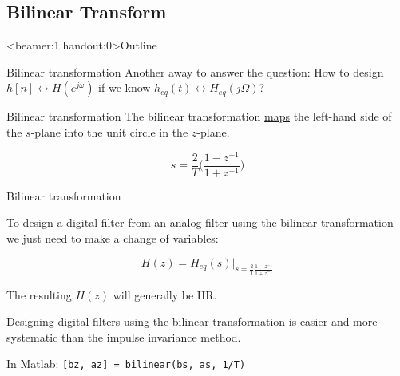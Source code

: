 \documentclass[10pt, handout]{beamer}
\begin{document}
%
\subsection{Bilinear Transform}
\begin{frame}<beamer:1|handout:0>{Outline}
\tableofcontents[currentsubsection]
\end{frame}

%
\begin{frame}{Bilinear transformation}
Another away to answer the question: How to design $h[n] \longleftrightarrow H(e^{j\omega})$ if we know $h_{eq}(t) \longleftrightarrow H_{eq}(j\Omega)$?

\begin{block}{Bilinear transformation}
	The bilinear transformation \underline{maps} the left-hand side of the $s$-plane into the unit circle in the $z$-plane.
	
	\begin{equation*}
		s = \frac{2}{T}\bigg(\frac{1 - z^{-1}}{1 + z^{-1}}\bigg) \tag{Bilinear transformation}
	\end{equation*}
	
	\begin{center}
		\resizebox{0.9\linewidth}{!}{}
	\end{center}	
\end{block}
\end{frame}

\begin{frame}{Bilinear transformation}

To design a digital filter from an analog filter using the bilinear transformation we just need to make a change of variables:

\begin{equation*}
H(z) = H_{eq}(s)|_{s = \frac{2}{T}\frac{1 - z^{-1}}{1 + z^{-1}}}
\end{equation*}

The resulting $H(z)$ will generally be IIR.

Designing digital filters using the bilinear transformation is easier and more systematic than the impulse invariance method.

In Matlab: \texttt{[bz, az] = bilinear(bs, as, 1/T)}

\end{frame}
\end{document}
